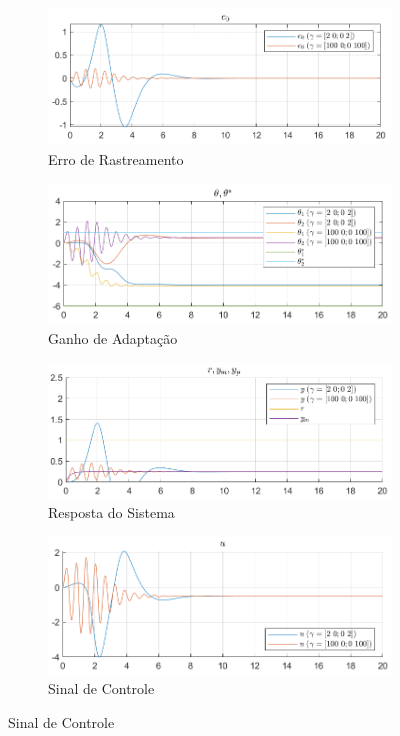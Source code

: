 \documentclass[10pt]{article}
\begin{document}
\begin{figure}[h!]
    \centering
    \begin{subfigure}[b]{0.35\textwidth}
        \centering
        \includegraphics[width=\textwidth]{img/fig05a.png}
        \caption{Erro de Rastreamento}
    \end{subfigure}
    \begin{subfigure}[b]{0.35\textwidth}
        \centering
        \includegraphics[width=\textwidth]{img/fig05b.png}
        \caption{Ganho de Adaptação}
    \end{subfigure}

    \begin{subfigure}[b]{0.35\textwidth}
        \centering
        \includegraphics[width=\textwidth]{img/fig05c.png}
        \caption{Resposta do Sistema}
    \end{subfigure}
    \begin{subfigure}[b]{0.35\textwidth}
        \centering
        \includegraphics[width=\textwidth]{img/fig05e.png}
        \caption{Sinal de Controle}
    \end{subfigure}


\end{figure}
\end{document}
